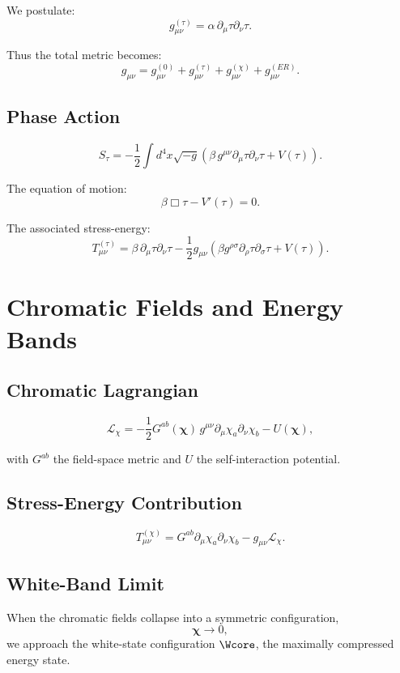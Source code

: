 We postulate:
\[
g^{(\tau)}_{\mu\nu}
=
\alpha\, \partial_\mu \tau \partial_\nu \tau.
\]

Thus the total metric becomes:
\[
g_{\mu\nu} 
= 
g^{(0)}_{\mu\nu}
+ g^{(\tau)}_{\mu\nu}
+ g^{(\chi)}_{\mu\nu}
+ g^{(ER)}_{\mu\nu}.
\]

\section{Phase Action}

\[
S_\tau
=
-\frac{1}{2}\int d^4x \sqrt{-g}\left(
\beta\, g^{\mu\nu}\partial_\mu\tau\partial_\nu\tau
+ V(\tau)
\right).
\]

The equation of motion:
\[
\beta \Box \tau - V'(\tau) = 0.
\]

The associated stress-energy:
\[
T^{(\tau)}_{\mu\nu}
=
\beta\, \partial_\mu\tau\partial_\nu\tau
-\frac{1}{2}g_{\mu\nu}
\left(
\beta g^{\rho\sigma}\partial_\rho\tau\partial_\sigma\tau
+ V(\tau)
\right).
\]

\chapter{Chromatic Fields and Energy Bands}

\section{Chromatic Lagrangian}

\[
\mathcal{L}_\chi
=
-\frac{1}{2}G^{ab}(\bm{\chi})\, g^{\mu\nu}\partial_\mu\chi_a\partial_\nu\chi_b
- U(\bm{\chi}),
\]

with $G^{ab}$ the field-space metric and $U$ the self-interaction potential.

\section{Stress-Energy Contribution}

\[
T^{(\chi)}_{\mu\nu}
=
G^{ab}\partial_\mu\chi_a\partial_\nu\chi_b
- g_{\mu\nu}\mathcal{L}_\chi.
\]

\section{White-Band Limit}

When the chromatic fields collapse into a symmetric configuration,
\[
\bm{\chi} \to 0,
\]
we approach the white-state configuration $\Wcore$, the maximally compressed energy state.
